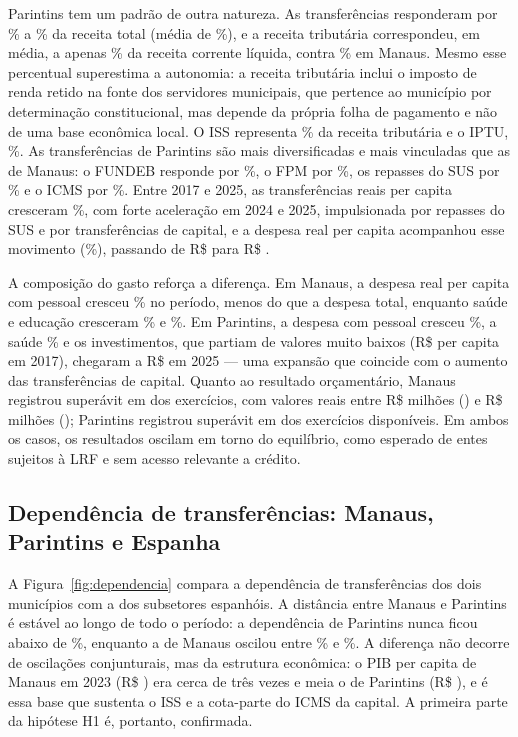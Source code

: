 

Parintins tem um padrão de outra natureza. As transferências responderam por \depParMin\% a \depParMax\% da receita total (média de \depParMedia\%), e a receita tributária correspondeu, em média, a apenas \autParMedia\% da receita corrente líquida, contra \autManMedia\% em Manaus. Mesmo esse percentual superestima a autonomia: a receita tributária inclui o imposto de renda retido na fonte dos servidores municipais, que pertence ao município por determinação constitucional, mas depende da própria folha de pagamento e não de uma base econômica local. O ISS representa \issSharePar\% da receita tributária e o IPTU, \iptuSharePar\%. As transferências de Parintins são mais diversificadas e mais vinculadas que as de Manaus: o FUNDEB responde por \fundebSharePar\%, o FPM por \fpmSharePar\%, os repasses do SUS por \susSharePar\% e o ICMS por \icmsSharePar\%. Entre 2017 e 2025, as transferências reais per capita cresceram \transfParVar\%, com forte aceleração em 2024 e 2025, impulsionada por repasses do SUS e por transferências de capital, e a despesa real per capita acompanhou esse movimento (\despParVar\%), passando de R\$ \despParIni{} para R\$ \despParFim.

A composição do gasto reforça a diferença. Em Manaus, a despesa real per capita com pessoal cresceu \pessoalManVar\% no período, menos do que a despesa total, enquanto saúde e educação cresceram \saudeManVar\% e \educManVar\%. Em Parintins, a despesa com pessoal cresceu \pessoalParVar\%, a saúde \saudeParVar\% e os investimentos, que partiam de valores muito baixos (R\$ \investParIni{} per capita em 2017), chegaram a R\$ \investParFim{} em 2025 --- uma expansão que coincide com o aumento das transferências de capital. Quanto ao resultado orçamentário, Manaus registrou superávit em \resPosMan{} dos \nAnosMan{} exercícios, com valores reais entre R\$ \resMinMan{} milhões (\anoResMinMan) e R\$ \resMaxMan{} milhões (\anoResMaxMan); Parintins registrou superávit em \resPosPar{} dos \nAnosPar{} exercícios disponíveis. Em ambos os casos, os resultados oscilam em torno do equilíbrio, como esperado de entes sujeitos à LRF e sem acesso relevante a crédito.

\subsection{Dependência de transferências: Manaus, Parintins e Espanha}

A Figura~\ref{fig:dependencia} compara a dependência de transferências dos dois municípios com a dos subsetores espanhóis. A distância entre Manaus e Parintins é estável ao longo de todo o período: a dependência de Parintins nunca ficou abaixo de \depParMin\%, enquanto a de Manaus oscilou entre \depManMin\% e \depManMax\%. A diferença não decorre de oscilações conjunturais, mas da estrutura econômica: o PIB per capita de Manaus em 2023 (R\$ \pibpcManFim) era cerca de três vezes e meia o de Parintins (R\$ \pibpcParFim), e é essa base que sustenta o ISS e a cota-parte do ICMS da capital. A primeira parte da hipótese H1 é, portanto, confirmada.

